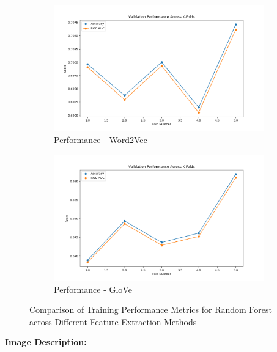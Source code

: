 \begin{figure}[H]
    \begin{subfigure}[b]{0.48\textwidth}
        \includegraphics[width=\textwidth]{img/report_info/img/1.4.RF/best_random_forest_word2vec.png}
        \caption{Performance - Word2Vec}
        \label{fig:rf-word2vec}
    \end{subfigure}
    \begin{subfigure}[b]{0.48\textwidth}
        \includegraphics[width=\textwidth]{img/report_info/img/1.4.RF/best_random_forest_glove.png}
        \caption{Performance - GloVe}
        \label{fig:rf-glove}
    \end{subfigure}
    
    \caption{Comparison of Training Performance Metrics for Random Forest across Different Feature Extraction Methods}
    \label{fig:rf-performance-group}
\end{figure}

\textbf{Image Description:}

